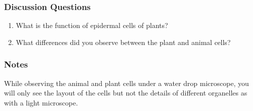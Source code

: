 \subsubsection*{Discussion Questions}
\begin{enumerate}
\item{What is the function of epidermal cells of plants?}
\item{What differences did you observe between the plant and animal cells?}
\end{enumerate}

\subsubsection*{Notes}
While observing the animal and plant cells under a water drop microscope, you will only see the layout of the cells but not the details of different organelles as with a light microscope. 
